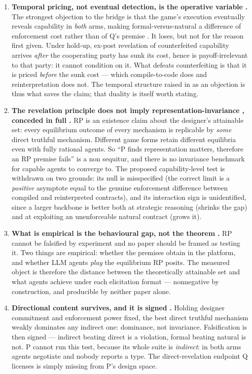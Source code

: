 \documentclass{article}
\begin{document}
\begin{enumerate}
\item \textbf{Temporal pricing, not eventual detection, is the operative variable .} The strongest objection to the bridge is that the game's execution eventually reveals capability in \emph{both} arms, making formal-versus-natural a difference of enforcement cost rather than of Q's premise . It loses, but not for the reason first given. Under hold-up, ex-post revelation of counterfeited capability arrives \emph{after} the cooperating party has sunk its cost, hence is payoff-irrelevant to that party: it cannot condition on it. What defeats counterfeiting is that it is priced \emph{before} the sunk cost --- which compile-to-code does and reinterpretation does not. The temporal structure raised in  as an objection is thus what saves the claim; that duality is itself worth stating.

\item \textbf{The revelation principle does not imply representation-invariance , conceded in full .} RP is an existence claim about the designer's attainable set: every equilibrium outcome of every mechanism is replicable by \emph{some} direct truthful mechanism. Different game forms retain different equilibria even with fully rational agents. So ``P finds representation matters, therefore an RP premise fails'' is a non sequitur, and there is no invariance benchmark for capable agents to converge to. The proposed capability-level test  is withdrawn on two grounds: its null is misspecified (the correct limit is a \emph{positive} asymptote equal to the genuine enforcement difference between compiled and reinterpreted contracts), and its interaction sign is unidentified, since a larger backbone is better both at strategic reasoning (shrinks the gap) and at exploiting an unenforceable natural contract (grows it).

\item \textbf{What is empirical is the behavioural gap, not the theorem .} RP cannot be falsified by experiment and no paper should be framed as testing it. Two things are empirical: whether the premises obtain in the platform, and whether LLM agents \emph{play} the equilibrium RP posits. The measured object is therefore the distance between the theoretically attainable set and what agents achieve under each elicitation format --- nonnegative by construction, and producible by neither paper alone.

\item \textbf{Directional content survives, and it is signed .} Holding designer commitment and enforcement power fixed, the best direct truthful mechanism weakly dominates any indirect one: dominance, not invariance. Falsification is then signed --- indirect beating direct is a violation, formal beating natural is not. P cannot run this test, because its whole suite is \emph{indirect}: in both arms agents negotiate and nobody reports a type. The direct-revelation endpoint Q licenses is simply missing from P's design space.


\end{enumerate}
\end{document}
